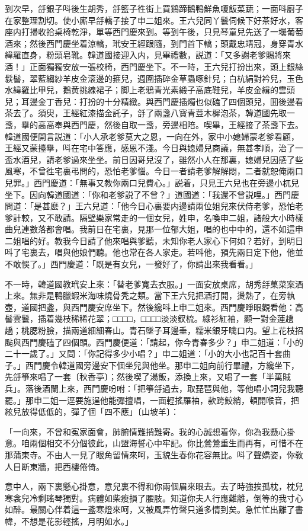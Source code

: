 到次早，㧱銀子呌後生胡秀，㧱籃子徃街上買鷄蹄鵝鴨鮮魚嗄飯菜蔬；一面呌廚子在家整理割切。使小廝早㧱轎子接了申二姐來。王六兒同丫鬟伺候下好茶好水，客座内打掃收拾桌椅乾淨，單等西門慶來到。等到午後，只見琴童兒先送了一壜葡萄酒來；然後西門慶坐着涼轎，玳安王經跟隨，到門首下轎；頭戴忠靖冠，身穿青水緯羅直身，粉頭皂靴。韓道國接迎入内，見畢禮數，説道：「又多謝老爹賜將來酒！」正面獨獨安放一張校椅，西門慶坐下。不一時，王六兒打扮出來，頭上銀絲䯼髻，翠藍縐紗羊皮金滚邊的箍兒，週圍插碎金草蟲啄針兒；白杭絹對衿兒，玉色水緯羅比甲兒，鵝黄挑線裙子；脚上老鴉青光素緞子高底鞋兒，羊皮金緝的雲頭兒；耳邊金丁香兒：打扮的十分精緻。與西門慶插燭也似磕了四個頭兒，囬後邊看茶去了。須臾，王經紅漆描金託子，㧱了兩盞八寳青荳木樨泡茶，韓道國先取一盞，擧的高高奉與西門慶，然後自取一盞，旁邊相陪。喫畢，王經接了茶盞下去。韓道國便開言説道：「小人承老爹莫大之恩，一向在外，家中小媳婦蒙老爹看顧，王經又蒙擡擧，呌在宅中答應，感恩不淺。今日與媳婦兒商議，無甚孝順，治了一盃水酒兒，請老爹過來坐坐。前日因哥兒沒了，雖然小人在那裏，媳婦兒因感了些風寒，不曾徃宅裏弔問的，恐怕老爹惱。今日一者請老爹解解悶，二者就恕俺兩口兒罪。」西門慶道：「無事又教你兩口兒費心。」説着，只見王六兒也在旁邊小杌兒坐下。因向韓道國道：「你和老爹説了不曾？」道國道：「我還不曾説哩。」西門慶問道：「是甚麽？」王六兒道：「他今日心裏要内邊請兩位姐兒來伏侍老爹，恐怕老爹計較，又不敢請。隔壁樂家常走的一個女兒，姓申，名喚申二姐，諸般大小時樣曲兒連數落都會唱。我前日在宅裏，見那一位郁大姐，唱的也中中的，還不如這申二姐唱的好。教我今日請了他來唱與爹聽，未知你老人家心下何如？若好，到明日呌了宅裏去，唱與他娘們聽。他也常在各人家走。若呌他，預先兩日定下他，他並不敢悞了。」西門慶道：「既是有女兒，一發好了，你請出來我看看。」

不一時，韓道國教玳安上來：「替老爹寬去衣服。」一面安放桌席，胡秀㧱菓菜案酒上來。無非是鴨臘蝦米海味燒骨秃之類。當下王六兒把酒打開，燙熱了，在旁執壺，道國把盞，與西門慶安席坐下。然後纔呌上申二姐來。西門慶睜眼觀看他：高髻雲鬟，插着幾枝稀稀花翠；□□□□，□□□□淡淡釵梳。綠衫紅袖，顯一對金蓮趫趫；桃腮粉臉，描兩道細細春山。青石墜子耳邊垂，糯米銀牙噙口内。望上花枝招颭與西門慶磕了四個頭。西門慶便道：「請起，你今青春多少？」申二姐道：「小的二十一歲了。」又問：「你記得多少小唱？」申二姐道：「小的大小也記百十套曲子。」西門慶令韓道國旁邊安下個坐兒與他坐。那申二姐向前行畢禮，方纔坐下，先㧱箏來唱了一套〔秋香亭〕；然後喫了湯飯，添換上來，又唱了一套「半萬賊兵」。落後酒闌上來，西門慶吩咐：「把箏㧱過去，取琵琶與他，等他唱小詞兒我聽罷。」那申二姐一逕要施逞他能彈擅唱，一面輕搖羅袖，款跨鮫綃，頓開喉音，把絃兒放得低低的，彈了個「四不應」〔山坡羊〕：

\begin{myquote}
「一向來，不曾和寃家面會，肺腑情難捎難寄。我的心誠想着你，你為我懸心掛意。咱兩個相交不分個彼此，山盟海誓心中牢記。你比鶯鶯重生而再有，可惜不在那蒲東寺。不由人一見了眼角留情來呵，玉貌生春你花容無比。呌了聲嬌姿，你敎人目断東牆，把西樓倦倚。

意中人，兩下裏懸心掛意，意兒裏不得和你兩個眉來眼去。去了時強挨孤枕，枕兒寒衾兒冷剩瑤琴獨對。病體如柴瘦損了腰肢。知道你夫人行應難離，倒等的我寸心如醉。最關心伴着這一盞寒燈來呵，又被風弄竹聲只道多情到矣。急忙忙出離了書幃，不想是花影輕搖，月明如水。」
\end{myquote}


